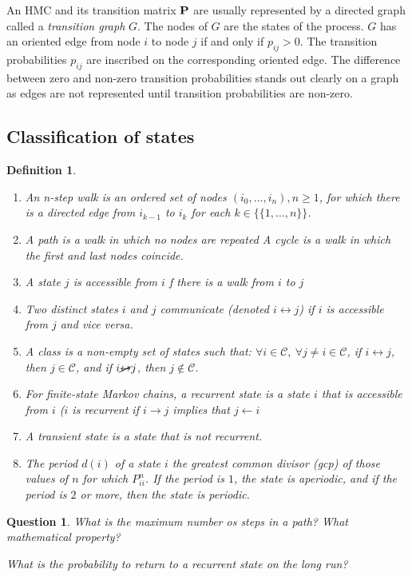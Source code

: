 \documentclass[12pt,a4paper]{article}
\newtheorem{definition}{Definition}
\newtheorem{question}{Question}
\newcommand{\bP}{\bold P}
\newcommand{\calC}{\mathcal C}
\begin{document}
	
	An HMC and its transition matrix $\bP$ are usually represented by a directed graph called a \textit{transition graph} $G$. 
	The nodes of $G$ are the states of the process. 
	$G$ has an oriented edge from node $i$ to node $j$ if and only if $p_{ij}>0$. 
	The transition probabilities $p_{ij}$ are inscribed on the corresponding oriented edge.
	The difference between zero and non-zero transition probabilities stands out clearly on a graph as edges are not represented until transition probabilities are non-zero.
	
\subsection{Classification of states}
\begin{definition}
	\begin{enumerate}
		\item An n-step walk is an ordered set of nodes $(i_0,\ldots,i_n), n\geq 1$, for which there is a directed edge from $i_{k-1}$ to $i_k$ for each $k\in\{\{1,\ldots,n\}\}$.
		\item A path is a walk in which no nodes are repeated
		A cycle is a walk in which the first and last nodes coincide.
		\item A state $j$ is accessible from $i$ f there is a walk from $i$ to $j$
		\item Two distinct states $i$ and $j$ communicate (denoted $i \leftrightarrow j$) if $i$ is accessible from $j$ and vice versa.
		\item A class is a non-empty set of states such that: $\forall i\in\calC,\ \forall j\neq i\in\calC$, if $i\leftrightarrow j$, then $j\in\calC$, and if  $i\cancel\leftrightarrow j$, then $j\notin\calC$.
		\item For finite-state Markov chains, a recurrent state is a state $i$ that is accessible from $i$ ($i$ is recurrent if $i\rightarrow j$ implies that $j\leftarrow i$
		\item A transient state is a state that is not recurrent.
		\item The period $d(i)$ of a state $i$ the greatest common divisor (gcp) of those values of $n$ for which $P^n_{ii}$. If the period is $1$, the state is aperiodic, and if the period is $2$ or more, then the state is periodic.
	\end{enumerate}
\end{definition}	
	\begin{question}
		What is the maximum number os steps in a path?
		What mathematical property?
		
		What is the probability to return to a recurrent state on the long run?
	\end{question}
	
\end{document}
